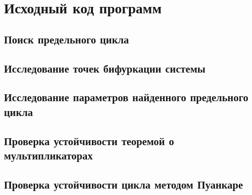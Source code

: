 \chapter{Исходный код программ}
\label{appendix:src}

\section{Поиск предельного цикла}

\clearpage

\section{Исследование точек бифуркации системы}

\clearpage

\section{Исследование параметров найденного предельного цикла}

\clearpage

\section{Проверка устойчивости теоремой о мультипликаторах}

\clearpage

\section{Проверка устойчивости цикла методом Пуанкаре}

\clearpage

